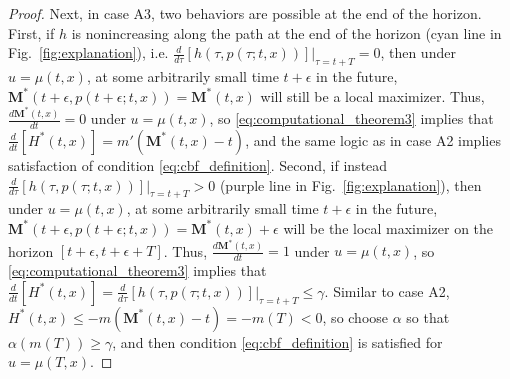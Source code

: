 \documentclass[10pt,conference]{ieeeconf}
\newcommand{\todo}[1]{\textcolor{red}{To Do: #1}}
\renewcommand{\(}{\left(}
\renewcommand{\)}{\right)}
\renewcommand{\[}{\left[}
\renewcommand{\]}{\right]}
\begin{document}
\begin{proof}
Next, in case A3, two behaviors are possible at the end of the horizon. First, if $h$ is nonincreasing along the path at the end of the horizon (cyan line in Fig.~\ref{fig:explanation}), i.e. $\frac{d}{d\tau}\left. [h(\tau,p(\tau;t,x))]\right|_{\tau = t+T} = 0$, then under $u = \mu(t,x)$, at some arbitrarily small time $t+\epsilon$ in the future, $\boldsymbol{M}^*(t+\epsilon,p(t+\epsilon;t,x)) = \boldsymbol{M}^*(t,x)$ will still be a local maximizer. Thus, $\frac{d\boldsymbol{M}^*(t,x)}{dt} = 0$ under $u = \mu(t,x)$, so \eqref{eq:computational_theorem3} implies that $\frac{d}{dt}[H^*(t,x)] = m'(\boldsymbol{M}^*(t,x) - t)$, and the same logic as in case A2 implies satisfaction of condition \eqref{eq:cbf_definition}. Second, if instead $\frac{d}{d\tau}\left. [h(\tau,p(\tau;t,x))]\right|_{\tau = t+T} > 0$ (purple line in Fig.~\ref{fig:explanation}), then under $u = \mu(t,x)$, at some arbitrarily small time $t+\epsilon$ in the future, $\boldsymbol{M}^*(t+\epsilon,p(t+\epsilon;t,x)) = \boldsymbol{M}^*(t,x)+\epsilon$ will be the local maximizer on the horizon $[t+\epsilon,t+\epsilon+T]$. Thus,  $\frac{d\boldsymbol{M}^*(t,x)}{dt} = 1$ under $u = \mu(t,x)$, so \eqref{eq:computational_theorem3} implies that $\frac{d}{dt}[H^*(t,x)] = \frac{d}{d\tau}\left.[h(\tau,p(\tau;t,x))]\right|_{\tau=t+T} \leq \gamma$. Similar to case A2, $H^*(t,x) \leq -m(\boldsymbol{M}^*(t,x) - t) = -m(T) < 0$, so choose $\alpha$ so that $\alpha(m(T)) \geq \gamma$, and then condition \eqref{eq:cbf_definition} is satisfied for $u = \mu(T,x)$.


\end{proof}
\end{document}
